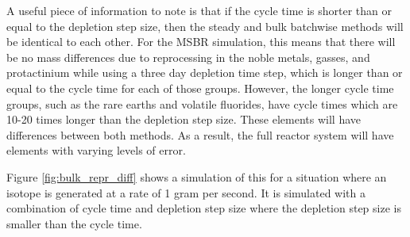 

A useful piece of information to note is that if the cycle time is shorter than or equal to the depletion step size, then the steady and bulk batchwise methods will be identical to each other.
For the MSBR simulation, this means that there will be no mass differences due to reprocessing in the noble metals, gasses, and protactinium while using a three day depletion time step, which is longer than or equal to the cycle time for each of those groups. %
However, the longer cycle time groups, such as the rare earths and volatile fluorides, have cycle times which are 10-20 times longer than the depletion step size. These elements will have differences between both methods. As a result, the full reactor system will have elements with varying levels of error.

Figure \ref{fig:bulk_repr_diff} shows a simulation of this for a situation where an isotope is generated at a rate of 1 gram per second. It is simulated with a combination of cycle time and depletion step size where the depletion step size is smaller than the cycle time.

